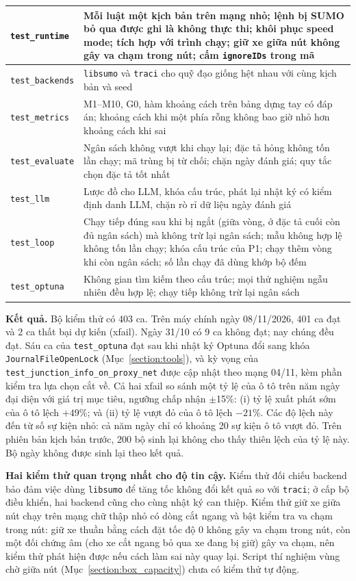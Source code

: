 \documentclass[../main.tex]{subfiles}
\begin{document}
\begin{table}[H]
\begin{tabular}{|p{3.6cm}|p{9.4cm}|}
\texttt{test\_runtime} & Mỗi luật một kịch bản trên mạng nhỏ; lệnh bị SUMO bỏ qua được ghi là không thực thi; khôi phục speed mode; tích hợp với trình chạy; giữ xe giữa nút không gây va chạm trong nút; cấm \texttt{ignoreIDs} trong mã \\ \hline
\texttt{test\_backends} & \texttt{libsumo} và \texttt{traci} cho quỹ đạo giống hệt nhau với cùng kịch bản và seed \\ \hline
\texttt{test\_metrics} & M1--M10, G0, hàm khoảng cách trên bảng dựng tay có đáp án; khoảng cách khi một phía rỗng không bao giờ nhỏ hơn khoảng cách khi sai \\ \hline
\texttt{test\_evaluate} & Ngân sách không vượt khi chạy lại; đặc tả hỏng không tốn lần chạy; mã trùng bị từ chối; chặn ngày đánh giá; quy tắc chọn đặc tả tốt nhất \\ \hline
\texttt{test\_llm} & Lược đồ cho LLM, khóa cấu trúc, phát lại nhật ký có kiểm định danh LLM, chặn rò rỉ dữ liệu ngày đánh giá \\ \hline
\texttt{test\_loop} & Chạy tiếp đúng sau khi bị ngắt (giữa vòng, ở đặc tả cuối còn đủ ngân sách) mà không trừ lại ngân sách; mẫu không hợp lệ không tốn lần chạy; khóa cấu trúc của P1; chạy thêm vòng khi còn ngân sách; số lần chạy đã dùng khớp bộ đếm \\ \hline
\texttt{test\_optuna} & Không gian tìm kiếm theo cấu trúc; mọi thử nghiệm ngẫu nhiên đều hợp lệ; chạy tiếp không trừ lại ngân sách \\ \hline
\end{tabular}
\end{table}

\textbf{Kết quả.} Bộ kiểm thử có 403 ca. Trên máy chính ngày 08/11/2026, 401 ca đạt và 2 ca thất bại dự kiến (xfail). Ngày 31/10 có 9 ca không đạt; nay chúng đều đạt. Sáu ca của \texttt{test\_optuna} đạt sau khi nhật ký Optuna đổi sang khóa \texttt{JournalFileOpenLock} (Mục~\ref{section:tools}), và kỳ vọng của \texttt{test\_junction\_info\_on\_proxy\_net} được cập nhật theo mạng 04/11, kèm phần kiểm tra lựa chọn cắt về. Cả hai xfail so sánh một tỷ lệ của ô tô trên năm ngày đại diện với giá trị mục tiêu, ngưỡng chấp nhận $\pm$15\%: (i) tỷ lệ xuất phát sớm của ô tô lệch $+49\%$; và (ii) tỷ lệ vượt đỏ của ô tô lệch $-21\%$.
Các độ lệch này đến từ số sự kiện nhỏ: cả năm ngày chỉ có khoảng 20 sự kiện ô tô vượt đỏ. Trên phiên bản kịch bản trước, 200 bộ sinh lại không cho thấy thiên lệch của tỷ lệ này. Bộ ngày không được sinh lại theo kết quả.

\textbf{Hai kiểm thử quan trọng nhất cho độ tin cậy.} Kiểm thử đối chiếu backend bảo đảm việc dùng \texttt{libsumo} để tăng tốc không đổi kết quả so với \texttt{traci}; ở cấp bộ điều khiển, hai backend cũng cho cùng nhật ký can thiệp. Kiểm thử giữ xe giữa nút chạy trên mạng chữ thập nhỏ có dòng cắt ngang và bật kiểm tra va chạm trong nút: giữ xe thuần bằng cách đặt tốc độ 0 không gây va chạm trong nút, còn một đối chứng âm (cho xe cắt ngang bỏ qua xe đang bị giữ) gây va chạm, nên kiểm thử phát hiện được nếu cách làm sai này quay lại. Script thí nghiệm vùng chờ giữa nút (Mục~\ref{section:box_capacity}) chưa có kiểm thử tự động.
\end{document}
